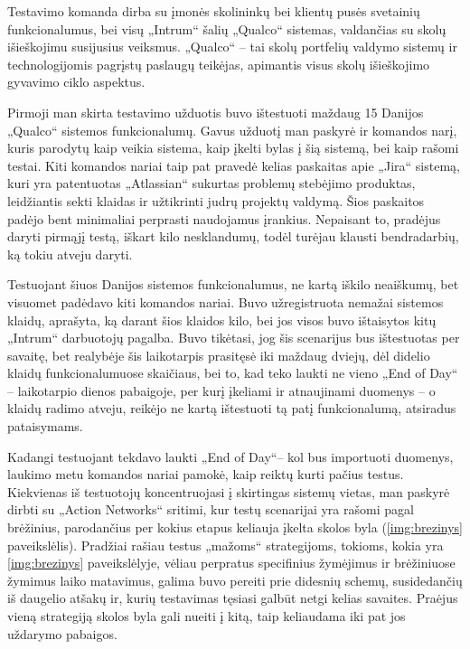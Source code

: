 \documentclass{VUMIFPSkursinis}
\begin{document}
Testavimo komanda dirba su įmonės skolininkų bei klientų pusės svetainių funkcionalumus, bei visų „Intrum“ šalių „Qualco“ sistemas, valdančias su skolų išieškojimu susijusius veiksmus. „Qualco“ -- tai skolų portfelių valdymo sistemų ir technologijomis pagrįstų paslaugų teikėjas, apimantis visus skolų išieškojimo gyvavimo ciklo aspektus.

Pirmoji man skirta testavimo užduotis buvo ištestuoti maždaug 15 Danijos „Qualco“ sistemos funkcionalumų. Gavus užduotį man paskyrė ir komandos narį, kuris parodytų kaip veikia sistema, kaip įkelti bylas į šią sistemą, bei kaip rašomi testai. Kiti komandos nariai taip pat pravedė kelias paskaitas apie „Jira“ sistemą, kuri yra patentuotas „Atlassian“ sukurtas problemų stebėjimo produktas, leidžiantis sekti klaidas ir užtikrinti judrų projektų valdymą. Šios paskaitos padėjo bent minimaliai perprasti naudojamus įrankius. Nepaisant to, pradėjus daryti pirmąjį testą, iškart kilo nesklandumų, todėl turėjau klausti bendradarbių, ką tokiu atveju daryti.

Testuojant šiuos Danijos sistemos funkcionalumus, ne kartą iškilo neaiškumų, bet visuomet padėdavo kiti komandos nariai. Buvo užregistruota nemažai sistemos klaidų, aprašyta, ką darant šios klaidos kilo, bei jos visos buvo ištaisytos kitų „Intrum“ darbuotojų pagalba. Buvo tikėtasi, jog šis scenarijus bus ištestuotas per savaitę, bet realybėje šis laikotarpis prasitęsė iki maždaug dviejų, dėl didelio klaidų funkcionalumuose skaičiaus, bei to, kad teko laukti ne vieno „End of Day“ -- laikotarpio dienos pabaigoje, per kurį įkeliami ir atnaujinami duomenys -- o klaidų radimo atveju, reikėjo ne kartą ištestuoti tą patį funkcionalumą, atsiradus pataisymams. 

Kadangi testuojant tekdavo laukti „End of Day“-- kol bus importuoti duomenys, laukimo metu komandos nariai pamokė, kaip reiktų kurti pačius testus. Kiekvienas iš testuotojų koncentruojasi į skirtingas sistemų vietas, man paskyrė dirbti su „Action Networks“ sritimi, kur testų scenarijai yra rašomi pagal brėžinius, parodančius per kokius etapus keliauja įkelta skolos byla (\ref{img:brezinys} paveikslėlis). Pradžiai rašiau testus „mažoms“ strategijoms, tokioms, kokia yra \ref{img:brezinys} paveikslėlyje, vėliau perpratus specifinius žymėjimus ir brėžiniuose žymimus laiko matavimus, galima buvo pereiti prie didesnių schemų, susidedančių iš daugelio atšakų ir, kurių testavimas tęsiasi galbūt netgi kelias savaites. Praėjus vieną strategiją skolos byla gali nueiti į kitą, taip keliaudama iki pat jos uždarymo pabaigos.
\end{document}
